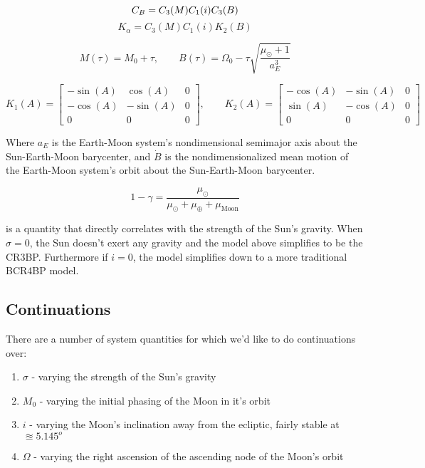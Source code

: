 \documentclass[]{article}
\begin{document}
	\begin{equation}
		C_B = C_3(M) C_1(i) C_3(B) \\
	\end{equation}
	\begin{equation}
		K_\alpha = C_3(M) C_1(i) K_2(B)
	\end{equation}
	
	\begin{equation}
		M(\tau) = M_0 + \tau, \quad\quad B(\tau) = \Omega_0 - \tau\sqrt{\frac{\mu_\odot + 1}{a_E^3}}
	\end{equation}
	
	\begin{equation*}
		K_1(A) = \begin{bmatrix}
			-\sin{(A)} & \cos{(A)} & 0 \\
			-\cos{(A)} & -\sin{(A)} & 0 \\
			0 & 0 & 0
		\end{bmatrix}, \quad\quad K_2(A) = \begin{bmatrix}
			-\cos{(A)} & -\sin{(A)} & 0 \\
			\sin{(A)} & -\cos{(A)} & 0 \\
			0 & 0 & 0
		\end{bmatrix}
	\end{equation*}
	
	Where $a_E$ is the Earth-Moon system's nondimensional semimajor axis about the Sun-Earth-Moon barycenter, and $\dot{B}$ is the nondimensionalized mean motion of the Earth-Moon system's orbit about the Sun-Earth-Moon barycenter.
	
	\begin{equation}
		1 - \gamma = \frac{\mu_\odot}{\mu_\odot + \mu_\oplus + \mu_\text{Moon}}
	\end{equation}
	
	is a quantity that directly correlates with the strength of the Sun's gravity.  When $\sigma = 0$, the Sun doesn't exert any gravity and the model above simplifies to be the CR3BP.  Furthermore if $i = 0$, the model simplifies down to a more traditional BCR4BP model.
	
	\subsection{Continuations}
	
	There are a number of system quantities for which we'd like to do continuations over:
	
	\begin{enumerate}
		\item $\sigma$ - varying the strength of the Sun's gravity
		\item $M_0$ - varying the initial phasing of the Moon in it's orbit
		\item $i$ - varying the Moon's inclination away from the ecliptic, fairly stable at $\approxeq 5.145^o$
		\item $\Omega$ - varying the right ascension of the ascending node of the Moon's orbit
	\end{enumerate}
	
\end{document}
